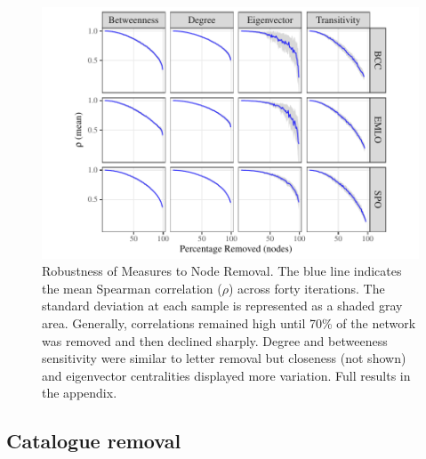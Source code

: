 \documentclass[]{article}
\begin{document}
\begin{figure}

{\centering \includegraphics{network_robustness_article_anon_files/figure-latex/nodesRemoval-1} 

}

\caption{Robustness of Measures to Node Removal. The blue line indicates the mean Spearman correlation ($\rho$) across forty iterations. The standard deviation at each sample is represented as a shaded gray area. Generally, correlations remained high until 70\% of the network was removed and then declined sharply. Degree and betweeness sensitivity were similar to letter removal but closeness (not shown) and eigenvector centralities displayed more variation. Full results in the appendix.}\label{fig:nodesRemoval}
\end{figure}

\hypertarget{catalogue-removal}{%
\subsection{Catalogue removal}\label{catalogue-removal}}
\end{document}
